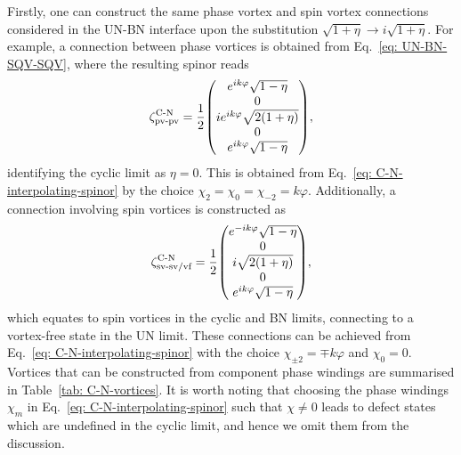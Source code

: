 Firstly, one can construct the same phase vortex and spin vortex connections
considered in the UN-BN interface upon the substitution \(\sqrt{1+\eta}
\rightarrow i\sqrt{1+\eta}\).
For example, a connection between phase vortices is obtained from
Eq.~\eqref{eq: UN-BN-SQV-SQV}, where the resulting spinor reads
\begin{align}
    \zeta^\text{C-N}_\text{pv-pv} = \frac{1}{2}\mqty(
        e^{ik\varphi}\sqrt{1 - \eta} \\
        0 \\
        ie^{ik\varphi}\sqrt{2(1 + \eta)} \\
        0 \\
        e^{ik\varphi}\sqrt{1 - \eta}
    ),
\end{align}
identifying the cyclic limit as \(\eta = 0\).
This is obtained from Eq.~\eqref{eq: C-N-interpolating-spinor} by the choice
\(\chi_2=\chi_0=\chi_{-2}=k\varphi\).
Additionally, a connection involving spin vortices is constructed as
\begin{align}
    \zeta^\text{C-N}_\text{sv-sv/vf} = \frac{1}{2}\mqty(
        e^{-ik\varphi}\sqrt{1 - \eta} \\
        0 \\
        i\sqrt{2(1 + \eta)} \\
        0 \\
        e^{ik\varphi}\sqrt{1 - \eta}
    ),
\end{align}
which equates to spin vortices in the cyclic and BN limits, connecting to a
vortex-free state in the UN limit.
These connections can be achieved from Eq.~\eqref{eq: C-N-interpolating-spinor}
with the choice \(\chi_{\pm 2} = \mp k\varphi\) and \(\chi_0=0\).
Vortices that can be constructed from component phase windings are summarised in
Table~\ref{tab: C-N-vortices}.
It is worth noting that choosing the phase windings \(\chi_m\) in
Eq.~\eqref{eq: C-N-interpolating-spinor} such that \(\chi \neq 0\) leads
to defect states which are undefined in the cyclic limit, and hence we omit
them from the discussion.
